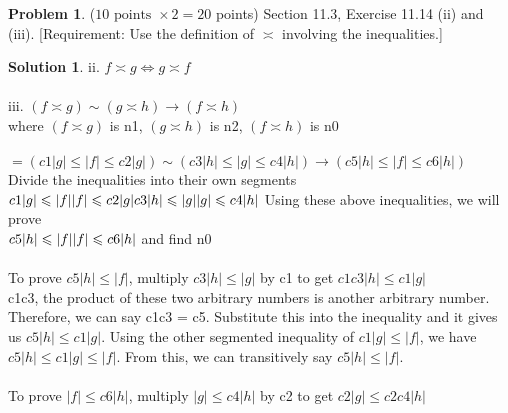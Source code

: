 \documentclass{article}
\theoremstyle{definition}
\newtheorem{problem}{Problem}
\newtheorem*{solution}{Solution}
\begin{document}
\begin{problem} ($10 \text{ points } \times 2 = 20$ points) Section 11.3, Exercise 11.14 (ii) and (iii).
[Requirement: Use the definition of $\asymp$ involving the inequalities.]
\end{problem}
\begin{solution} 
ii. $f \asymp g \iff g \asymp f$ \\
\\
iii. $(f \asymp g) \sim (g \asymp h) \to (f \asymp h)$ \\
where $(f \asymp g)$ is n1, $(g \asymp h)$ is n2, $(f \asymp h)$ is n0 \\
\\
$= (c1 \vert g \vert \leqslant \vert f \vert \leqslant c2 \vert g \vert) \sim (c3 \vert h \vert \leqslant \vert g \vert \leqslant c4 \vert h \vert) \to (c5 \vert h \vert \leqslant \vert f \vert \leqslant c6 \vert h \vert)$ \\
Divide the inequalities into their own segments \\
$c1\vert g \vert \leqslant \vert f \vert \\
\vert f \vert \leqslant c2 \vert g \vert \\
c3 \vert h \vert \leqslant \vert g \vert \\
\vert g \vert \leqslant c4 \vert h \vert \\$
Using these above inequalities, we will prove \\
$c5 \vert h \vert \leqslant \vert f \vert \\
\vert f \vert \leqslant c6 \vert h \vert \\$ and find n0 \\
\\
To prove $c5 \vert h \vert \leqslant \vert f \vert$, multiply $c3 \vert h \vert \leqslant \vert g \vert$ by c1 to get $c1c3 \vert h \vert \leqslant c1\vert g \vert$ \\
c1c3, the product of these two arbitrary numbers is another arbitrary number. Therefore, we can say c1c3 = c5. Substitute this into the inequality and it gives us $c5 \vert h \vert \leqslant c1\vert g \vert$. Using the other segmented inequality of $c1\vert g \vert \leqslant \vert f \vert$, we have $c5 \vert h \vert \leqslant c1\vert g \vert \leqslant \vert f \vert$. From this, we can transitively say $c5 \vert h \vert \leqslant \vert f \vert$. \\
\\
To prove $\vert f \vert \leqslant c6 \vert h \vert$, multiply $\vert g \vert \leqslant c4 \vert h \vert$ by c2 to get $c2 \vert g \vert \leqslant c2c4\vert h \vert$ \\

\end{solution}
\end{document}
